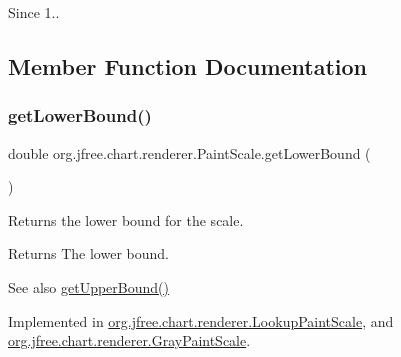 \begin{DoxySince}{Since}
1.. 
\end{DoxySince}


\subsection{Member Function Documentation}
\mbox{\label{interfaceorg_1_1jfree_1_1chart_1_1renderer_1_1_paint_scale_a125f1d305abf1f3764b62f5a9c5fabbd}} 
\subsubsection{\texorpdfstring{get\+Lower\+Bound()}{getLowerBound()}}
{\footnotesize\ttfamily double org.\+jfree.\+chart.\+renderer.\+Paint\+Scale.\+get\+Lower\+Bound (\begin{DoxyParamCaption}{ }\end{DoxyParamCaption})}

Returns the lower bound for the scale.

\begin{DoxyReturn}{Returns}
The lower bound.
\end{DoxyReturn}
\begin{DoxySeeAlso}{See also}
\mbox{\hyperlink{interfaceorg_1_1jfree_1_1chart_1_1renderer_1_1_paint_scale_abf6986bb5661248213645ea975828495}{get\+Upper\+Bound()}} 
\end{DoxySeeAlso}


Implemented in \mbox{\hyperlink{classorg_1_1jfree_1_1chart_1_1renderer_1_1_lookup_paint_scale_a7ef26ef52021e5a5c09b28c174913511}{org.\+jfree.\+chart.\+renderer.\+Lookup\+Paint\+Scale}}, and \mbox{\hyperlink{classorg_1_1jfree_1_1chart_1_1renderer_1_1_gray_paint_scale_aa66a8fc46c5cf10fd357d677e93ec48f}{org.\+jfree.\+chart.\+renderer.\+Gray\+Paint\+Scale}}.

\mbox{\label{interfaceorg_1_1jfree_1_1chart_1_1renderer_1_1_paint_scale_a32b81d8ac78e030422937dc97526661d}} 
